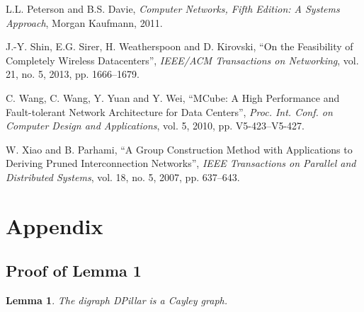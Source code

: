 \documentclass{article}
\newcounter{fig}
\newtheorem{lemma}[definition]{Lemma}
\begin{document}
\begin{thebibliography}{99}
 L.L. Peterson and B.S. Davie, \emph{Computer Networks, Fifth Edition\/\emph{:} A Systems Approach},
 Morgan Kaufmann, 2011.



 J.-Y. Shin, E.G. Sirer, H. Weatherspoon and D. Kirovski, ``On the Feasibility of Completely Wireless Datacenters'',  \emph{IEEE/ACM Transactions on Networking}, vol. 21, no. 5, 2013, pp. 1666--1679.



 C. Wang, C. Wang, Y. Yuan and Y. Wei, ``MCube: A High Performance and Fault-tolerant Network Architecture for Data Centers'', \emph{Proc. Int. Conf. on Computer Design and Applications}, vol. 5, 2010, pp. V5-423--V5-427.

 W. Xiao and B. Parhami, ``A Group Construction Method with Applications to Deriving Pruned Interconnection Networks'', \emph{IEEE Transactions on Parallel and Distributed Systems}, vol. 18, no. 5, 2007, pp. 637--643.




\end{thebibliography}

\appendix
\renewcommand{\thesection}{A}\setcounter{figure}{0} \renewcommand{\thefigure}{A.\arabic{figure}}
\setcounter{table}{0} \renewcommand{\thetable}{A.\arabic{table}}

\section*{Appendix}
\subsection{Proof of Lemma 1}

\begin{lemma}
The digraph DPillar is a Cayley graph.
\end{lemma}
\end{document}
